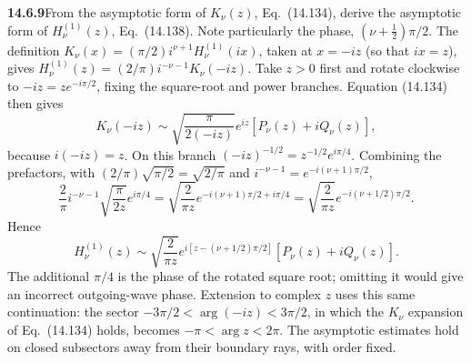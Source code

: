 \par\bigskip
\noindent\textbf{14.6.9}\quad From the asymptotic form of $K_{\nu}(z)$,
Eq.~(14.134), derive the asymptotic form of $H_{\nu}^{(1)}(z)$,
Eq.~(14.138). Note particularly the phase, $(\nu+\frac{1}{2})\pi/2$.
\solution
The definition $K_\nu(x)=(\pi/2)i^{\nu+1}H_\nu^{(1)}(ix)$, taken at
$x=-iz$ (so that $ix=z$), gives
$H_\nu^{(1)}(z)=(2/\pi)i^{-\nu-1}K_\nu(-iz)$.
Take $z>0$ first and rotate clockwise to
$-iz=ze^{-i\pi/2}$, fixing the square-root and power branches.
Equation (14.134) then gives
\[
K_\nu(-iz)\sim\sqrt{\frac\pi{2(-iz)}}e^{iz}
[P_\nu(z)+iQ_\nu(z)],
\]
because $i(-iz)=z$. On this branch
$(-iz)^{-1/2}=z^{-1/2}e^{i\pi/4}$. Combining the prefactors, with
$(2/\pi)\sqrt{\pi/2}=\sqrt{2/\pi}$ and
$i^{-\nu-1}=e^{-i(\nu+1)\pi/2}$,
\[
\frac2\pi i^{-\nu-1}\sqrt{\frac\pi{2z}}e^{i\pi/4}
=\sqrt{\frac2{\pi z}}
e^{-i(\nu+1)\pi/2+i\pi/4}
=\sqrt{\frac2{\pi z}}e^{-i(\nu+1/2)\pi/2}.
\]
Hence
\[
\boxed{H_\nu^{(1)}(z)\sim\sqrt{\frac2{\pi z}}
e^{i[z-(\nu+1/2)\pi/2]}[P_\nu(z)+iQ_\nu(z)]}.
\]
The additional $\pi/4$ is the phase of the rotated square root;
omitting it would give an incorrect outgoing-wave phase. Extension
to complex $z$ uses this same continuation: the sector
$-3\pi/2<\arg(-iz)<3\pi/2$, in which the $K_\nu$ expansion of
Eq.~(14.134) holds, becomes $-\pi<\arg z<2\pi$. The asymptotic
estimates hold on closed subsectors away from their boundary rays,
with order fixed.

